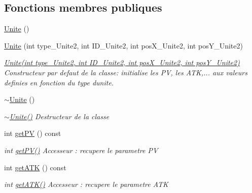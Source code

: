 \subsection*{Fonctions membres publiques}
\begin{DoxyCompactItemize}
\item 
\hyperlink{classUnite_a4fed2aa808630902de024d0a2f29887c}{Unite} ()
\item 
\mbox{\label{classUnite_ac9aa222e500f22324ed8ce92623fa29d}} 
\hyperlink{classUnite_ac9aa222e500f22324ed8ce92623fa29d}{Unite} (int type\+\_\+\+Unite2, int I\+D\+\_\+\+Unite2, int pos\+X\+\_\+\+Unite2, int pos\+Y\+\_\+\+Unite2)
\begin{DoxyCompactList}\small\item\em \hyperlink{classUnite_ac9aa222e500f22324ed8ce92623fa29d}{Unite(int type\+\_\+\+Unite2, int I\+D\+\_\+\+Unite2, int pos\+X\+\_\+\+Unite2, int pos\+Y\+\_\+\+Unite2)} Constructeur par defaut de la classe\+: initialise les PV, les A\+TK,... aux valeurs definies en fonction du type d\textquotesingle{}unite. \end{DoxyCompactList}\item 
\mbox{\label{classUnite_ad8465e00f082a58d3be3a039eba46a53}} 
\hyperlink{classUnite_ad8465e00f082a58d3be3a039eba46a53}{$\sim$\+Unite} ()
\begin{DoxyCompactList}\small\item\em \hyperlink{classUnite_ad8465e00f082a58d3be3a039eba46a53}{$\sim$\+Unite()} Destructeur de la classe \end{DoxyCompactList}\item 
\mbox{\label{classUnite_a12a0e6067af1c5600564652260258ba4}} 
int \hyperlink{classUnite_a12a0e6067af1c5600564652260258ba4}{get\+PV} () const
\begin{DoxyCompactList}\small\item\em int \hyperlink{classUnite_a12a0e6067af1c5600564652260258ba4}{get\+P\+V()} Accesseur \+: recupere le parametre PV \end{DoxyCompactList}\item 
\mbox{\label{classUnite_a237652ec20e66a62b0507290e4d63a68}} 
int \hyperlink{classUnite_a237652ec20e66a62b0507290e4d63a68}{get\+A\+TK} () const
\begin{DoxyCompactList}\small\item\em int \hyperlink{classUnite_a237652ec20e66a62b0507290e4d63a68}{get\+A\+T\+K()} Accesseur \+: recupere le parametre A\+TK \end{DoxyCompactList}\item 

\end{DoxyCompactItemize}

